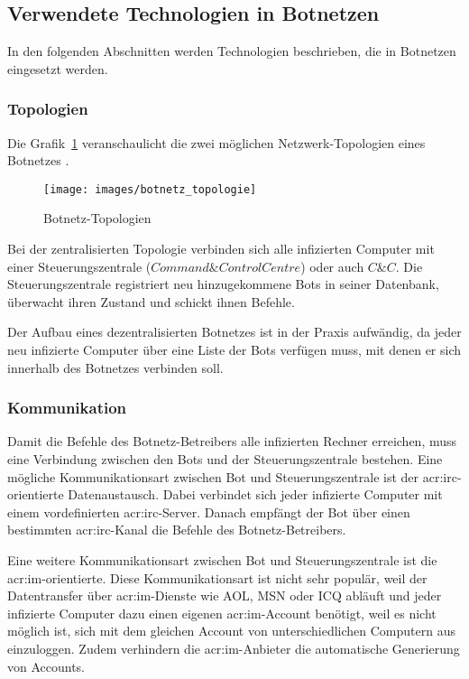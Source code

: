 \subsection{Verwendete Technologien in Botnetzen}
In den folgenden Abschnitten werden Technologien beschrieben, die in Botnetzen
eingesetzt werden.
\subsubsection{Topologien}
Die Grafik~\ref{fig:botnetz_topologie} veranschaulicht die zwei 
möglichen Netzwerk-Topologien eines Botnetzes \cite{dahl}.
\begin{figure}
  \centering
  \texttt{[image: images/botnetz\_topologie]}
  \caption{Botnetz-Topologien}
  \label{fig:botnetz_topologie}
\end{figure}
Bei der zentralisierten Topologie verbinden sich alle
infizierten Computer mit einer Steuerungszentrale ($Command \& Control Centre$) oder
auch $C\&C$. Die Steuerungszentrale registriert neu hinzugekommene Bots in seiner
Datenbank, überwacht ihren Zustand und schickt ihnen Befehle.

Der Aufbau eines dezentralisierten Botnetzes ist in der Praxis aufwändig, da 
jeder neu infizierte Computer über eine Liste der Bots verfügen muss, mit denen 
er sich innerhalb des Botnetzes verbinden soll.

\subsubsection{Kommunikation}
Damit die Befehle des Botnetz-Betreibers alle infizierten Rechner erreichen, 
muss eine Verbindung zwischen den Bots und der Steuerungszentrale bestehen. 
Eine mögliche Kommunikationsart zwischen Bot und Steuerungszentrale ist der
\gls{acr:irc}-orientierte Datenaustausch. Dabei verbindet sich jeder 
infizierte Computer mit einem vordefinierten \gls{acr:irc}-Server. 
Danach empfängt der Bot über einen bestimmten \gls{acr:irc}-Kanal die Befehle des Botnetz-Betreibers.

Eine weitere Kommunikationsart zwischen Bot und Steuerungszentrale ist die 
\gls{acr:im}-orientierte. Diese Kommunikationsart ist nicht sehr populär, weil 
der Datentransfer über \gls{acr:im}-Dienste wie AOL, MSN oder ICQ abläuft
und jeder infizierte Computer dazu einen eigenen \gls{acr:im}-Account benötigt, weil
es nicht möglich ist, sich mit dem gleichen Account von unterschiedlichen 
Computern aus einzuloggen. Zudem verhindern die \gls{acr:im}-Anbieter die automatische
Generierung von Accounts.

